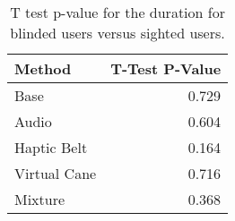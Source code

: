 
\begin{table}[!htb]
\centering
\caption{T test p-value for the duration for blinded users versus sighted users.}
\label{tab:ttest_duration}
\begin{tabular}{lr}
\toprule
      Method &  T-Test P-Value \\
\midrule
        Base &           0.729 \\
       Audio &           0.604 \\
 Haptic Belt &           0.164 \\
Virtual Cane &           0.716 \\
     Mixture &           0.368 \\
\bottomrule
\end{tabular}
\end{table}

